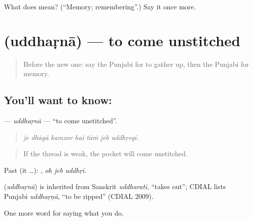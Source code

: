 \begin{tcolorbox}[breakable,colback=teal!4,colframe=teal!35!black,title={Before you move on}]
What does  mean? (\textquotedblleft{}Memory; remembering\textquotedblright{}.) Say it once more.
\end{tcolorbox}
\section[\texorpdfstring{\pa{ਉੱਧੜਨਾ} (uddhaṛnā)}{ਉੱਧੜਨਾ (uddhaṛnā)}]{ (uddhaṛnā) — to come unstitched}

\label{lesson:PA-C232-uddharna}



\begin{quote}
Before the new one: say the Punjabi for to gather up, then the Punjabi for memory.
\end{quote}

\subsection*{You'll want to know: }
\textbf{} — \emph{uddhaṛnā} — \textquotedblleft{}to come unstitched\textquotedblright{}.

\begin{quote}
      
\end{quote}

\begin{quote}
\emph{je dhāgā kamzor hai tāṁ jeb uddhṛegī.}
\end{quote}

\begin{quote}
If the thread is weak, the pocket will come unstitched.
\end{quote}

Past (it …):   , \emph{oh jeb uddhṛī}.

\begin{cousinweb}
\textbf{} (\emph{uddhaṛnā}) is inherited from Sanskrit \emph{uddharati}, \textquotedblleft{}takes out\textquotedblright{}; CDIAL lists Punjabi \emph{uddhaṛṇā}, \textquotedblleft{}to be ripped\textquotedblright{} (CDIAL 2009).
\end{cousinweb}

\begin{grammarlens}[title={What you've built}]
One more word for saying what you do.
\end{grammarlens}

